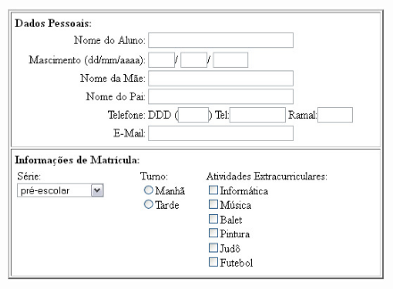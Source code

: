 \documentclass{beamer}
\begin{document}
\begin{frame}
\begin{figure}
    \centering
    \includegraphics[width=\linewidth]{img/formulario.png}

    \label{fig:enter-label}
\end{figure}
    
\end{frame}
\end{document}
